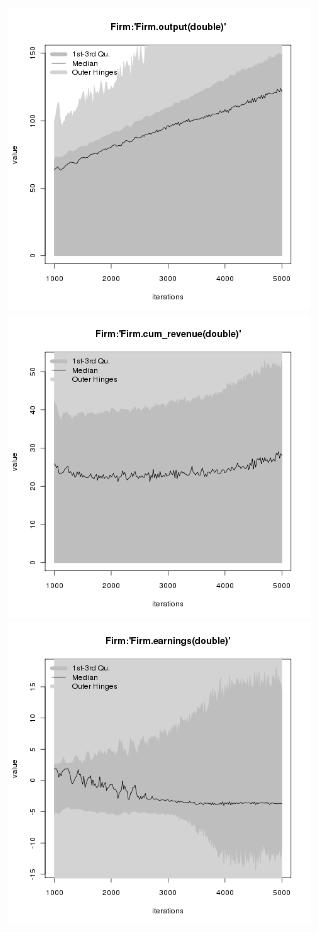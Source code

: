 \begin{figure}[H!]
\centering\leavevmode
\begin{minipage}{17cm}
\centering\leavevmode
\includegraphics[width=8cm]{./png/tax_0.10/Firm-output.png}
\includegraphics[width=8cm]{./png/tax_0.10/Firm-cum_revenue.png}\\
\includegraphics[width=8cm]{./png/tax_0.10/Firm-earnings.png}

\end{minipage}
\end{figure}
